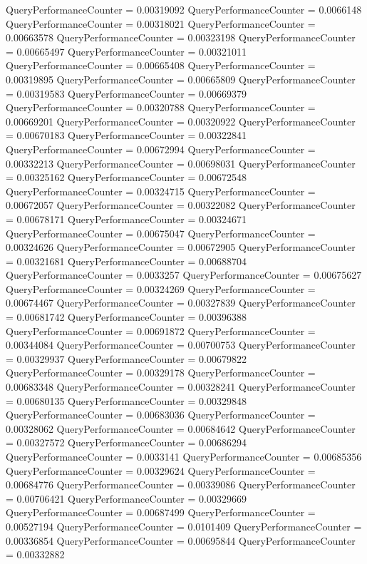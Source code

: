 \documentclass[9pt]{article}
\theoremstyle{plain}
\theoremstyle{definition}
\theoremstyle{remark}
\numberwithin{equation}{section}
\begin{document}
QueryPerformanceCounter  =  0.00319092
QueryPerformanceCounter  =  0.0066148
QueryPerformanceCounter  =  0.00318021
QueryPerformanceCounter  =  0.00663578
QueryPerformanceCounter  =  0.00323198
QueryPerformanceCounter  =  0.00665497
QueryPerformanceCounter  =  0.00321011
QueryPerformanceCounter  =  0.00665408
QueryPerformanceCounter  =  0.00319895
QueryPerformanceCounter  =  0.00665809
QueryPerformanceCounter  =  0.00319583
QueryPerformanceCounter  =  0.00669379
QueryPerformanceCounter  =  0.00320788
QueryPerformanceCounter  =  0.00669201
QueryPerformanceCounter  =  0.00320922
QueryPerformanceCounter  =  0.00670183
QueryPerformanceCounter  =  0.00322841
QueryPerformanceCounter  =  0.00672994
QueryPerformanceCounter  =  0.00332213
QueryPerformanceCounter  =  0.00698031
QueryPerformanceCounter  =  0.00325162
QueryPerformanceCounter  =  0.00672548
QueryPerformanceCounter  =  0.00324715
QueryPerformanceCounter  =  0.00672057
QueryPerformanceCounter  =  0.00322082
QueryPerformanceCounter  =  0.00678171
QueryPerformanceCounter  =  0.00324671
QueryPerformanceCounter  =  0.00675047
QueryPerformanceCounter  =  0.00324626
QueryPerformanceCounter  =  0.00672905
QueryPerformanceCounter  =  0.00321681
QueryPerformanceCounter  =  0.00688704
QueryPerformanceCounter  =  0.0033257
QueryPerformanceCounter  =  0.00675627
QueryPerformanceCounter  =  0.00324269
QueryPerformanceCounter  =  0.00674467
QueryPerformanceCounter  =  0.00327839
QueryPerformanceCounter  =  0.00681742
QueryPerformanceCounter  =  0.00396388
QueryPerformanceCounter  =  0.00691872
QueryPerformanceCounter  =  0.00344084
QueryPerformanceCounter  =  0.00700753
QueryPerformanceCounter  =  0.00329937
QueryPerformanceCounter  =  0.00679822
QueryPerformanceCounter  =  0.00329178
QueryPerformanceCounter  =  0.00683348
QueryPerformanceCounter  =  0.00328241
QueryPerformanceCounter  =  0.00680135
QueryPerformanceCounter  =  0.00329848
QueryPerformanceCounter  =  0.00683036
QueryPerformanceCounter  =  0.00328062
QueryPerformanceCounter  =  0.00684642
QueryPerformanceCounter  =  0.00327572
QueryPerformanceCounter  =  0.00686294
QueryPerformanceCounter  =  0.0033141
QueryPerformanceCounter  =  0.00685356
QueryPerformanceCounter  =  0.00329624
QueryPerformanceCounter  =  0.00684776
QueryPerformanceCounter  =  0.00339086
QueryPerformanceCounter  =  0.00706421
QueryPerformanceCounter  =  0.00329669
QueryPerformanceCounter  =  0.00687499
QueryPerformanceCounter  =  0.00527194
QueryPerformanceCounter  =  0.0101409
QueryPerformanceCounter  =  0.00336854
QueryPerformanceCounter  =  0.00695844
QueryPerformanceCounter  =  0.00332882
\end{document}
